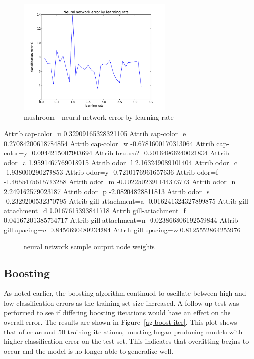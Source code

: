 \documentclass{sig-alternate}
\begin{document}
\begin{figure}[!htbp]
    \centering
    \includegraphics[width=3in]{data/agaricus-lepiota/perceptron/learning-rate.pdf}
    \caption{mushroom - neural network error by learning rate \label{ag-nn-lr}}
\end{figure} 

\begin{verbbox}
Attrib cap-color=u    0.32909165328321105
Attrib cap-color=e    0.27084200618784854
Attrib cap-color=w    -0.6781600170313064
Attrib cap-color=y    -0.0944215007903694
Attrib bruises?    -0.20164966240021834
Attrib odor=a    1.9591467769018915
Attrib odor=l    2.163249089101404
Attrib odor=c    -1.938000290279853
Attrib odor=y    -0.7210176961657636
Attrib odor=f    -1.4655475615783258
Attrib odor=m    -0.0022502391144373773
Attrib odor=n    2.249162579023187
Attrib odor=p    -2.08204828811813
Attrib odor=s    -0.2329200532370795
Attrib gill-attachment=a    -0.016241324327899875
Attrib gill-attachment=d    0.0167616393841718
Attrib gill-attachment=f    0.04167201385764717
Attrib gill-attachment=n    -0.023866806192559844
Attrib gill-spacing=c    -0.8456690489234284
Attrib gill-spacing=w    0.8125552864255976
\end{verbbox}

\begin{figure}[!htbp]
    \centering
    \theverbbox
    \caption{neural network sample output node weights \label{ag-nn-weights}}
\end{figure}


\subsection{Boosting}

As noted earlier, the boosting algorithm continued to oscillate between high and low classification errors as the training set size increased. A follow up test was performed to see if differing boosting iterations would have an effect on the overall error. The results are shown in Figure~\ref{ag-boost-iter}. This plot shows that after around 50 training iterations, boosting began producing models with higher classification error on the test set. This indicates that overfitting begins to occur and the model is no longer able to generalize well.
\end{document}
